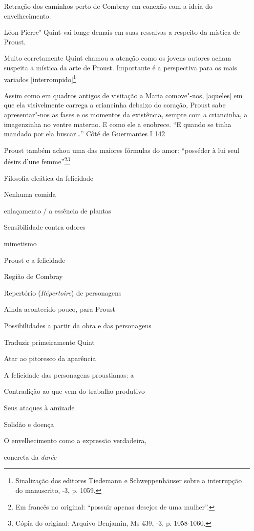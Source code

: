 Retração dos caminhos perto de Combray em conexão com a ideia do
envelhecimento.

Léon Pierre"-Quint vai longe demais em suas ressalvas a respeito da
mística de Proust.

Muito corretamente Quint chamou a atenção como os jovens autores acham
suspeita a mística da arte de Proust. Importante é a perspectiva para os
mais variados {[}interrompido{]}\footnote{Sinalização dos editores
  Tiedemann e Schweppenhäuser sobre a interrupção do manuscrito,
  -3, p. 1059. \versal{[N. T.]}}

Assim como em quadros antigos de visitação a Maria comove"-nos,
{[}aqueles{]} em que ela visivelmente carrega a criancinha debaixo do
coração, Proust sabe apresentar"-nos as fases e os momentos da
existência, sempre com a criancinha, a imagenzinha no ventre materno. E
como ele a enobrece. ``E quando se tinha mandado por ela buscar\ldots{}''
Côté de Guermantes I 142

Proust também achou uma das maiores fórmulas do amor: ``posséder à lui
seul désirs d'une femme''\footnote{Em francês no original:
  ``possuir apenas desejos de uma mulher''. \versal{[N. T.]}}\footnote{Cópia do original: Arquivo Benjamin, Ms 439, -3, p. 1058-1060.}

Filosofia eleática da felicidade

Nenhuma comida

enlaçamento / a essência de plantas

Sensibilidade contra odores

mimetismo

Proust e a felicidade

Região de Combray

Repertório (\emph{Répertoire}) de personagens

Ainda acontecido pouco, para Proust

Possibilidades a partir da obra e das personagens

Traduzir primeiramente Quint

Atar ao pitoresco da aparência

A felicidade das personagens proustianas: a

Contradição ao que vem do trabalho produtivo

Seus ataques à amizade

Solidão e doença

O envelhecimento como a expressão verdadeira,

concreta da \emph{durée}
  
